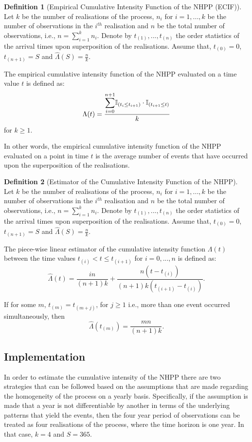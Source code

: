\documentclass[12pt]{article}
\theoremstyle{definition}
\newtheorem{definition}{Definition}[section]
\begin{document}
\begin{definition}[Empirical Cumulative Intensity Function of the NHPP (ECIF)]
    Let $k$ be the number of realisations of the process, $n_i$ for $i=1,...,k$ be the number of observations in the $i^{th}$ realisation and $n$ be the  total number of observations, i.e., $n=\sum_{i=1}^k n_i$. Denote by $t_{(1)}, ...,t_{(n)}$ the order statistics of the arrival times upon superposition of the realisations. Assume that, $t_{(0)}=0$, $t_{(n+1)}=S$ and $\hat{\Lambda}(S)=\frac{n}{k}$.
    
    The empirical cumulative intensity function of the NHPP evaluated on a time value $t$ is defined as:
    \begin{equation}
        \Lambda(t)=\frac{\mathlarger{\sum_{i=0}^{n+1}} \mathbb{I}_{(t_i\leq t_{i+1})} \cdot \mathbb{I}_{(t_{i+1}\leq t)}}{k}
    \end{equation}
    for $k\geq 1$.
    
    In other words, the empirical cumulative intensity function of the NHPP evaluated on a point in time $t$ is the average number of events that have occurred upon the superposition of the realisations. 
\end{definition}

\begin{definition}[Estimator of the Cumulative Intensity Function of the NHPP]
    Let $k$ be the number of realisations of the process, $n_i$ for $i=1,...,k$ be the number of observations in the $i^{th}$ realisation and $n$ be the  total number of observations, i.e., $n=\sum_{i=1}^k n_i$. Denote by $t_{(1)}, ...,t_{(n)}$ the order statistics of the arrival times upon superposition of the realisations. Assume that, $t_{(0)}=0$, $t_{(n+1)}=S$ and $\hat{\Lambda}(S)=\frac{n}{k}$.
    
    The piece-wise linear estimator of the cumulative intensity function $\Lambda(t)$ between the time values $t_{(i)}<t\leq t_{(i+1)}$ for $i=0,...,n$ is defined as:
    \begin{equation}\label{estimator}
    \hat{\Lambda}(t) = \frac{in}{(n+1)k} + \frac{n(t-t_{(i)})}{(n+1)k(t_{(i+1)}-t_{(i)})}.
    \end{equation} 
    
    If for some $m$, $t_{(m)}=t_{(m+j)}$, for $j\geq 1$ i.e., more than one event occurred simultaneously, then $$\hat{\Lambda}(t_{(m)}) = \frac{mn}{(n+1)k}.$$
\end{definition}

\subsection{Implementation}
In order to estimate the cumulative intensity of the NHPP there are two strategies that can be followed based on the assumptions that are made regarding the homogeneity of the process on a yearly basis. Specifically, if the assumption is made that a year is not differentiable by another in terms of the underlying patterns that yield the events, then the four year period of observations can be treated as four realisations of the process, where the time horizon is one year. In that case, $k=4$ and $S=365$.
\end{document}
